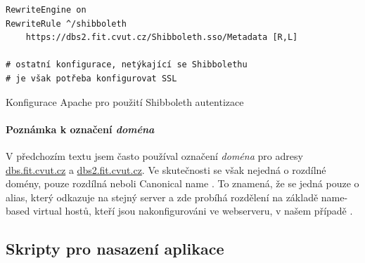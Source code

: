 \begin{listing}
	\expandafter\def\csname PY@tok@err\endcsname{} %
	\begin{verbatim}
RewriteEngine on
RewriteRule ^/shibboleth
    https://dbs2.fit.cvut.cz/Shibboleth.sso/Metadata [R,L] 

# ostatní konfigurace, netýkající se Shibbolethu
# je však potřeba konfigurovat SSL
	\end{verbatim}
	\caption{Konfigurace Apache pro použití Shibboleth autentizace} \label{code:apache-shibboleth}
\end{listing}

\paragraph{Poznámka k označení \emph{doména}}
V předchozím textu jsem často používal označení \emph{doména} pro adresy \url{dbs.fit.cvut.cz} a \url{dbs2.fit.cvut.cz}. Ve skutečnosti se však nejedná o rozdílné domény, pouze rozdílná  neboli Canonical name \cite{dns}. To znamená, že se jedná pouze o alias, který odkazuje na stejný server a zde probíhá rozdělení na základě name-based virtual hostů, kteří jsou nakonfigurováni ve webserveru, v našem případě .

\subsection{Skripty pro nasazení aplikace} \label{app:deploy_script}

